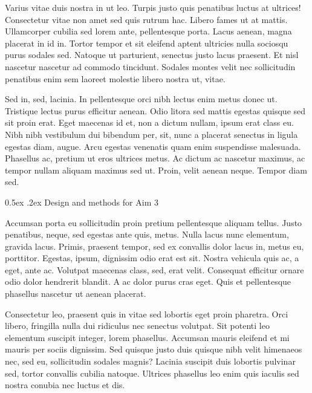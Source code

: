 \documentclass[11pt,]{article}
\makeatletter
\renewcommand\subsubsection{
  \@startsection{subsubsection}{3}{\z@}
    {-1.0ex\@plus -1ex \@minus -.2ex}%
    {0.5ex \@plus .2ex}%
    {\normalfont\normalsize\bf}} %
\makeatother
\begin{document}
Varius vitae duis nostra in ut leo. Turpis justo quis penatibus luctus
at ultrices! Consectetur vitae non amet sed quis rutrum hac. Libero
fames ut at mattis. Ullamcorper cubilia sed lorem ante, pellentesque
porta. Lacus aenean, magna placerat in id in. Tortor tempor et sit
eleifend aptent ultricies nulla sociosqu purus sodales sed. Natoque ut
parturient, senectus justo lacus praesent. Et nisl nascetur nascetur ad
commodo tincidunt. Sodales montes velit nec sollicitudin penatibus enim
sem laoreet molestie libero nostra ut, vitae.

Sed in, sed, lacinia. In pellentesque orci nibh lectus enim metus donec
ut. Tristique lectus purus efficitur aenean. Odio litora sed mattis
egestas quisque sed sit proin erat. Eget maecenas id et, non a dictum
nullam, ipsum erat class eu. Nibh nibh vestibulum dui bibendum per, sit,
nunc a placerat senectus in ligula egestas diam, augue. Arcu egestas
venenatis quam enim suspendisse malesuada. Phasellus ac, pretium ut eros
ultrices metus. Ac dictum ac nascetur maximus, ac tempor nullam aliquam
maximus sed ut. Proin, velit aenean neque. Tempor diam sed.

\hypertarget{design-and-methods-for-aim-3}{%
\subsubsection{Design and methods for Aim
3}\label{design-and-methods-for-aim-3}}

Accumsan porta eu sollicitudin proin pretium pellentesque aliquam
tellus. Justo penatibus, neque, sed egestas ante quis, metus. Nulla
lacus nunc elementum, gravida lacus. Primis, praesent tempor, sed ex
convallis dolor lacus in, metus eu, porttitor. Egestas, ipsum, dignissim
odio erat est sit. Nostra vehicula quis ac, a eget, ante ac. Volutpat
maecenas class, sed, erat velit. Consequat efficitur ornare odio dolor
hendrerit blandit. A ac dolor purus cras eget. Quis et pellentesque
phasellus nascetur ut aenean placerat.

Consectetur leo, praesent quis in vitae sed lobortis eget proin
pharetra. Orci libero, fringilla nulla dui ridiculus nec senectus
volutpat. Sit potenti leo elementum suscipit integer, lorem phasellus.
Accumsan mauris eleifend et mi mauris per sociis dignissim. Sed quisque
justo duis quisque nibh velit himenaeos nec, sed eu, sollicitudin
sodales magnis? Lacinia suscipit duis lobortis pulvinar sed, tortor
convallis cubilia natoque. Ultrices phasellus leo enim quis iaculis sed
nostra conubia nec luctus et dis.
\end{document}
